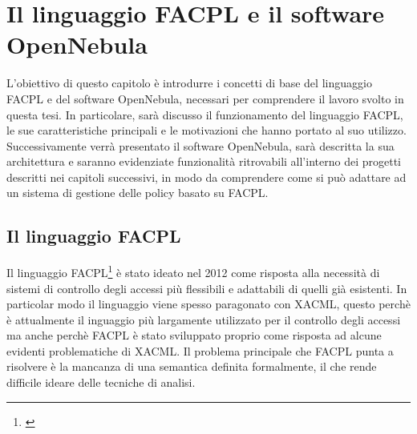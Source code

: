 
\chapter{Il linguaggio FACPL e il software OpenNebula}
\label{cap:capitolo2}
L'obiettivo di questo capitolo è introdurre i concetti di base del linguaggio FACPL e del software OpenNebula, necessari per comprendere il lavoro svolto in questa tesi. In particolare, sarà discusso il funzionamento del linguaggio FACPL, le sue caratteristiche principali e le motivazioni che hanno portato al suo utilizzo. Successivamente verrà presentato il software OpenNebula, sarà descritta la sua architettura e saranno evidenziate funzionalità ritrovabili all'interno dei progetti descritti nei capitoli successivi, in modo da comprendere come si può adattare ad un sistema di gestione delle policy basato su FACPL.\medbreak
\section{Il linguaggio FACPL}
Il linguaggio FACPL\footnote{\cite{FAPCLTesi}} è stato ideato nel 2012 come risposta alla necessità di sistemi di controllo degli accessi più flessibili e adattabili di quelli già esistenti. In particolar modo il linguaggio viene spesso paragonato con XACML, questo perchè è attualmente il inguaggio più largamente utilizzato per il controllo degli accessi ma anche perchè FACPL è stato sviluppato proprio come risposta ad alcune evidenti problematiche di XACML. Il problema principale che FACPL punta a risolvere è la mancanza di una semantica definita formalmente, il che rende difficile ideare delle tecniche di analisi.\medbreak
